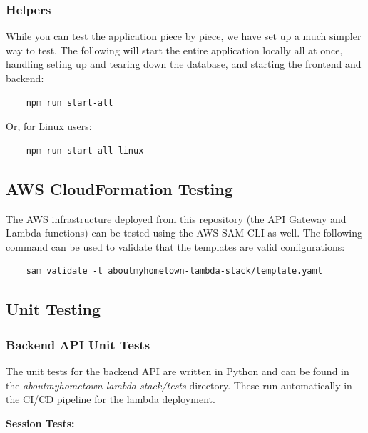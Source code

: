 \documentclass[12pt]{article}
\begin{document}
\subsubsection{Helpers}

While you can test the application piece by piece, we have set up a much simpler way to test. The following will start the entire application locally all at once, handling seting up and tearing down the database, and starting the frontend and backend:

\begin{verbatim}
    npm run start-all
\end{verbatim}

Or, for Linux users:

\begin{verbatim}
    npm run start-all-linux
\end{verbatim}

\subsection{AWS CloudFormation Testing}

The AWS infrastructure deployed from this repository (the API Gateway and Lambda functions) can be tested using the AWS SAM CLI as well. The following command can be used to validate that the templates are valid configurations:

\begin{verbatim}
    sam validate -t aboutmyhometown-lambda-stack/template.yaml
\end{verbatim}

\subsection{Unit Testing}

\subsubsection{Backend API Unit Tests}

The unit tests for the backend API are written in Python and can be found in the \textit{aboutmyhometown-lambda-stack/tests} directory. These run automatically in the CI/CD pipeline for the lambda deployment.

\textbf{Session Tests:}
\end{document}

